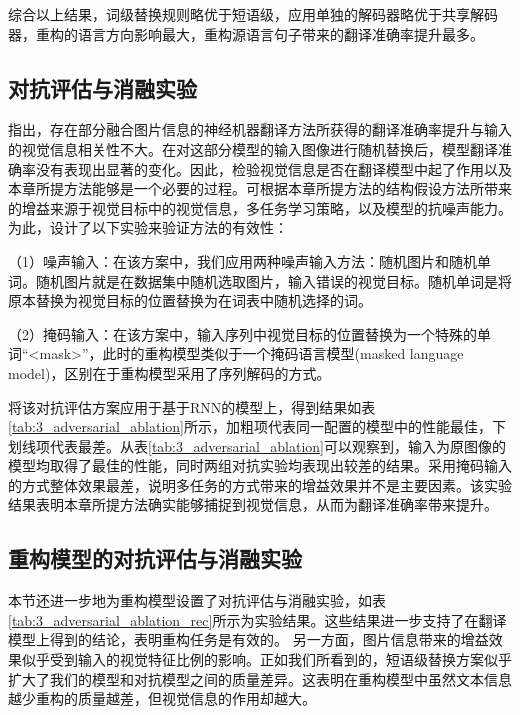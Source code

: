 综合以上结果，词级替换规则略优于短语级，应用单独的解码器略优于共享解码器，重构的语言方向影响最大，重构源语言句子带来的翻译准确率提升最多。

\subsection{对抗评估与消融实验}
\label{sec:3_adversarial_ablation}

指出，存在部分融合图片信息的神经机器翻译方法所获得的翻译准确率提升与输入的视觉信息相关性不大。在对这部分模型的输入图像进行随机替换后，模型翻译准确率没有表现出显著的变化。因此，检验视觉信息是否在翻译模型中起了作用以及本章所提方法能够是一个必要的过程。可根据本章所提方法的结构假设方法所带来的增益来源于视觉目标中的视觉信息，多任务学习策略，以及模型的抗噪声能力。为此，设计了以下实验来验证方法的有效性：

（1）{\sffamily 噪声输入：}在该方案中，我们应用两种噪声输入方法：随机图片和随机单词。随机图片就是在数据集中随机选取图片，输入错误的视觉目标。随机单词是将原本替换为视觉目标的位置替换为在词表中随机选择的词。

（2）{\sffamily 掩码输入：}在该方案中，输入序列中视觉目标的位置替换为一个特殊的单词“<mask>”，此时的重构模型类似于一个掩码语言模型(masked language model)，区别在于重构模型采用了序列解码的方式。


将该对抗评估方案应用于基于RNN的模型上，得到结果如表\ref{tab:3_adversarial_ablation}所示，加粗项代表同一配置的模型中的性能最佳，下划线项代表最差。从表\ref{tab:3_adversarial_ablation}可以观察到，输入为原图像的模型均取得了最佳的性能，同时两组对抗实验均表现出较差的结果。采用掩码输入的方式整体效果最差，说明多任务的方式带来的增益效果并不是主要因素。该实验结果表明本章所提方法确实能够捕捉到视觉信息，从而为翻译准确率带来提升。

\subsection{重构模型的对抗评估与消融实验}
\label{sec:3_adversarial_ablation_rec}


本节还进一步地为重构模型设置了对抗评估与消融实验，如表\ref{tab:3_adversarial_ablation_rec}所示为实验结果。这些结果进一步支持了在翻译模型上得到的结论，表明重构任务是有效的。 另一方面，图片信息带来的增益效果似乎受到输入的视觉特征比例的影响。正如我们所看到的，短语级替换方案似乎扩大了我们的模型和对抗模型之间的质量差异。这表明在重构模型中虽然文本信息越少重构的质量越差，但视觉信息的作用却越大。

